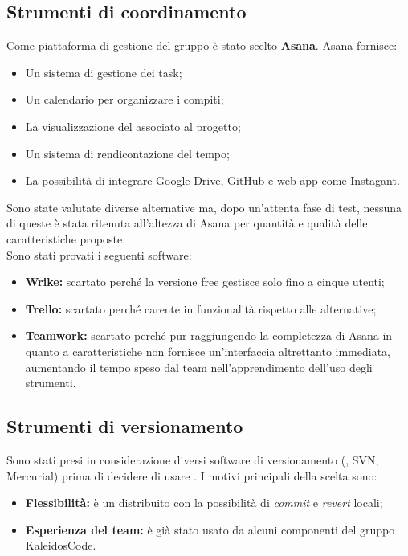 \documentclass[../NormeDiProgetto.tex]{subfiles}
\begin{document}
		\subsection{Strumenti di coordinamento}
			Come piattaforma di gestione del gruppo è stato scelto \textbf{Asana}. Asana fornisce:
			\begin{itemize}
				\item Un sistema di gestione dei task;
				\item Un calendario per organizzare i compiti;
				\item La visualizzazione del  associato al progetto;
				\item Un sistema di rendicontazione del tempo;
				\item La possibilità di integrare Google Drive, GitHub e web app come Instagant.
			\end{itemize}
			Sono state valutate diverse alternative ma, dopo un'attenta fase di test, nessuna di queste è stata ritenuta all'altezza di Asana per quantità e qualità delle caratteristiche proposte. \\
			Sono stati provati i seguenti software:
			\begin{itemize}
				\item \textbf{Wrike:} scartato perché la versione free gestisce solo fino a cinque utenti;
				\item \textbf{Trello:} scartato perché carente in funzionalità rispetto alle alternative;  
				\item \textbf{Teamwork:} scartato perché pur raggiungendo la completezza di Asana in quanto a caratteristiche non fornisce un'interfaccia altrettanto immediata, aumentando il tempo speso dal team nell'apprendimento dell'uso degli strumenti.
			\end{itemize}
		\subsection{Strumenti di versionamento}
			Sono stati presi in considerazione diversi software di versionamento (, SVN, Mercurial) prima di decidere di usare \textbf{}. I motivi principali della scelta sono: 
			\begin{itemize}
				\item \textbf{Flessibilità:}  è un  distribuito con la possibilità di \textit{commit} e \textit{revert} locali;
				\item \textbf{Esperienza del team:}  è già stato usato da alcuni componenti del gruppo KaleidosCode.
			\end{itemize}
\end{document}
